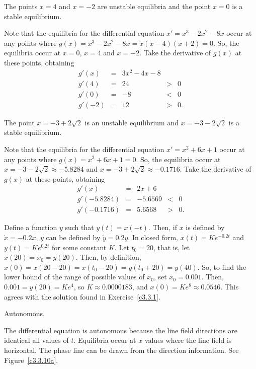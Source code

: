 \documentclass{ximera}
\begin{document}
\ans The points $x=4$ and $x = -2$ are unstable equilibria and the point 
$x = 0$ is a stable equilibrium.

\soln Note that the equilibria for the differential equation
$x' = x^3 - 2x^2 - 8x$ occur at any points where
$g(x) = x^3 - 2x^2 - 8x = x(x - 4)(x + 2) = 0$.
So, the equilibria occur at $x=0$, $x = 4$ and $x = -2$.  Take the
derivative of $g(x)$ at these points, obtaining
\[
\begin{array}{rcccl}
g'(x) & = & 3x^2-4x-8 \\
g'(4) & = & 24 & > & 0 \\
g'(0) & = & -8 & < & 0\\
g'(-2) & = & 12 & > & 0.\end{array}
\]

\ans The point $x = -3+2\sqrt{2}$ is an unstable equilibrium and 
$x = -3-2\sqrt{2}$ is a stable equilibrium.

\soln Note that the equilibria for the differential equation
$x' = x^2 + 6x + 1$ occur at any points where
$g(x) = x^2 + 6x + 1 = 0$.  So, the equilibria occur at $x =
-3-2\sqrt{2}\approx -5.8284$ and $x = -3+2\sqrt{2}\approx -0.1716$.  Take the
derivative of $g(x)$ at these points, obtaining
\[
\begin{array}{rcccl}
g'(x) & = & 2x + 6 \\
g'(-5.8284) & = & -5.6569 & < & 0 \\
g'(-0.1716) & = & 5.6568 & > & 0.\end{array}
\]

Define a function $y$ such that $y(t) = x(-t)$.  Then, if $x$ is defined by
$\dot{x} = -0.2x$, $y$ can be defined by $\dot{y} = 0.2y$.  In closed form,
$x(t) = Ke^{-0.2t}$ and $y(t) = Ke^{0.2t}$ for some constant $K$.  Let $t_0
= 20$, that is, let $x(20) = x_0 = y(20)$.  Then, by definition,
$x(0) = x(20 - 20) = x(t_0 - 20) = y(t_0 + 20) = y(40)$.  So, to find the
lower bound of the range of possible values of $x_0$, set $x_0 = 0.001$.
Then, $0.001 = y(20) = Ke^4$, so $K \approx 0.0000183$, and $x(0) = Ke^8
\approx 0.0546$.  This agrees with the solution found in
Exercise~\ref{c3.3.1}.

 \ans Autonomous.

\soln  The differential equation is autonomous because the line field 
directions are identical all values of $t$.  Equilibria occur at $x$ values 
where the line field is horizontal.  The phase line can be drawn from the 
direction information.  See Figure~\ref{c3.3.10a}.
\end{document}
